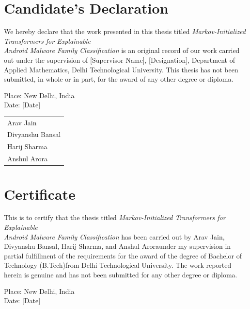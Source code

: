 \documentclass[12pt]{report}
\newcommand{\thesistitle}{Markov-Initialized Transformers for Explainable\\Android Malware Family Classification}
\newcommand{\university}{Delhi Technological University}
\newcommand{\department}{Department of Applied Mathematics}
\newcommand{\degree}{Bachelor of Technology (B.Tech)}
\newcommand{\place}{New Delhi, India}
\newcommand{\candidateone}{Arav Jain}
\newcommand{\candidatetwo}{Divyanshu Bansal}
\newcommand{\candidatethree}{Harij Sharma}
\newcommand{\candidatefour}{Anshul Arora}
\newcommand{\supervisor}{[Supervisor Name]}
\newcommand{\supervisordesignation}{[Designation]}
\begin{document}
\setcounter{page}{1}

\chapter*{Candidate's Declaration}

We hereby declare that the work presented in this thesis titled
\textit{\thesistitle} is an original record of our work carried out under the
supervision of \supervisor, \supervisordesignation, \department,
\university. This thesis has not been submitted, in whole or in part, for the
award of any other degree or diploma.

\vspace{1cm}
\noindent Place: \place \\
Date: [Date]

\vspace{1cm}
\begin{flushright}
\begin{tabular}{l}
\candidateone \\
\candidatetwo \\
\candidatethree \\
\candidatefour \\
\end{tabular}
\end{flushright}

\chapter*{Certificate}

This is to certify that the thesis titled \textit{\thesistitle} has been
carried out by \candidateone, \candidatetwo, \candidatethree, and
\candidatefour under my supervision in partial fulfillment of the
requirements for the award of the degree of \degree from \university.
The work reported herein is genuine and has not been submitted for any
other degree or diploma.

\vspace{1cm}
\noindent Place: \place \\
Date: [Date]
\end{document}
